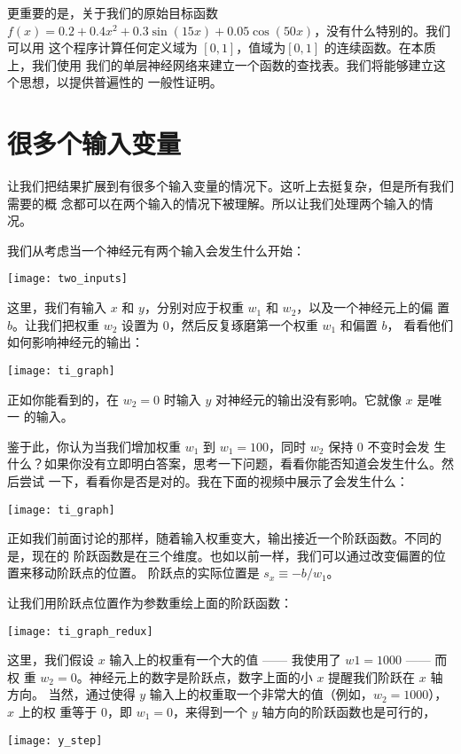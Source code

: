更重要的是，关于我们的原始目标函数
$f(x) = 0.2+0.4 x^2+0.3 \sin(15 x) + 0.05 \cos(50 x)$，没有什么特别的。我们可以用
这个程序计算任何定义域为 $[0, 1]$，值域为$[0, 1]$ 的连续函数。在本质上，我们使用
我们的单层神经网络来建立一个函数的查找表。我们将能够建立这个思想，以提供普遍性的
一般性证明。

\section{很多个输入变量}
\label{sec:many_input_variables}

让我们把结果扩展到有很多个输入变量的情况下。这听上去挺复杂，但是所有我们需要的概
念都可以在两个输入的情况下被理解。所以让我们处理两个输入的情况。

我们从考虑当一个神经元有两个输入会发生什么开始：
\begin{center}
  \texttt{[image: two\_inputs]}
\end{center}

这里，我们有输入 $x$ 和 $y$，分别对应于权重 $w_1$ 和 $w_2$，以及一个神经元上的偏
置 $b$。让我们把权重 $w_2$ 设置为 $0$，然后反复琢磨第一个权重 $w_1$ 和偏置 $b$，
看看他们如何影响神经元的输出：
\begin{center}
  \texttt{[image: ti\_graph]}
\end{center}

正如你能看到的，在 $w_2 = 0$ 时输入 $y$ 对神经元的输出没有影响。它就像 $x$ 是唯一
的输入。

鉴于此，你认为当我们增加权重 $w_1$ 到 $w_1 = 100$，同时 $w_2$ 保持 $0$ 不变时会发
生什么？如果你没有立即明白答案，思考一下问题，看看你能否知道会发生什么。然后尝试
一下，看看你是否是对的。我在下面的视频中展示了会发生什么：
\begin{center}
  \texttt{[image: ti\_graph]}
\end{center}

正如我们前面讨论的那样，随着输入权重变大，输出接近一个阶跃函数。不同的是，现在的
阶跃函数是在三个维度。也如以前一样，我们可以通过改变偏置的位置来移动阶跃点的位置。
阶跃点的实际位置是 $s_x \equiv -b / w_1$。

让我们用阶跃点位置作为参数重绘上面的阶跃函数：
\begin{center}
  \texttt{[image: ti\_graph\_redux]}
\end{center}

这里，我们假设 $x$ 输入上的权重有一个大的值 —— 我使用了 $w1 = 1000$ —— 而权
重 $w_2 = 0$。神经元上的数字是阶跃点，数字上面的小 $x$ 提醒我们阶跃在 $x$ 轴方向。
当然，通过使得 $y$ 输入上的权重取一个非常大的值（例如，$w_2 = 1000$），$x$ 上的权
重等于 $0$，即 $w_1 = 0$，来得到一个 $y$ 轴方向的阶跃函数也是可行的，
\begin{center}
  \texttt{[image: y\_step]}
\end{center}

